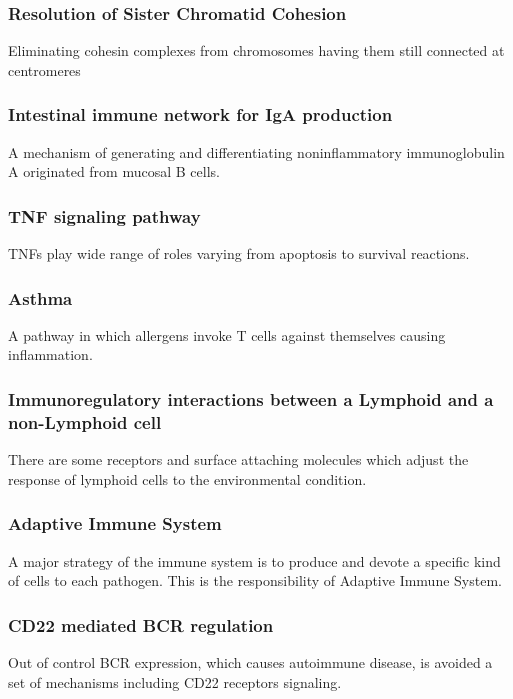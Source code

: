 \documentclass[3p,authoryear,preprint,12pt]{elsarticle}
\begin{document}
\subsubsection{Resolution of Sister Chromatid Cohesion}
Eliminating cohesin complexes from chromosomes having them still connected at centromeres %

\subsubsection{Intestinal immune network for IgA production}
A mechanism of generating and differentiating noninflammatory immunoglobulin A originated from mucosal B cells. %

\subsubsection{TNF signaling pathway}
TNFs play wide range of roles varying from apoptosis to survival reactions. %

\subsubsection{Asthma}
A pathway in which allergens invoke T cells against themselves causing inflammation. %

\subsubsection{Immunoregulatory interactions between a Lymphoid and a non-Lymphoid cell}
There are some receptors and surface attaching molecules which adjust the response of lymphoid cells to the environmental condition. %

\subsubsection{Adaptive Immune System}
A major strategy of the immune system is to produce and devote a specific kind of cells to each pathogen. This is the responsibility of Adaptive Immune System.

\subsubsection{CD22 mediated BCR regulation}
Out of control BCR expression, which causes autoimmune disease, is avoided a set of mechanisms including CD22 receptors signaling. %
\end{document}
